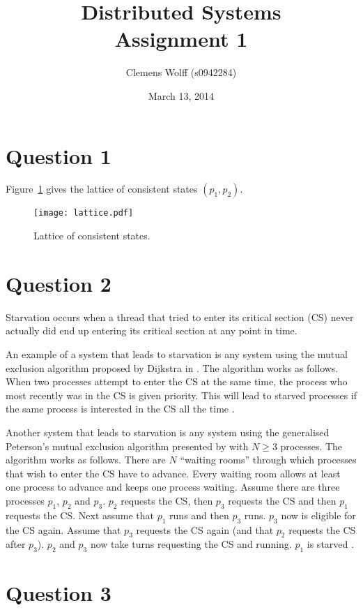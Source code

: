 \documentclass[a4paper,onecolumn,oneside]{article}
\title{Distributed Systems\\Assignment 1}
\author{Clemens Wolff (s0942284)}
\date{March 13, 2014}
\begin{document}
\maketitle

\section*{Question 1}

Figure~\ref{fig:lattice} gives the lattice of consistent states $(p_1,p_2)$.

\begin{figure}[h]
\texttt{[image: lattice.pdf]}
\caption{Lattice of consistent states.}
\label{fig:lattice}
\end{figure}

\section*{Question 2}

Starvation occurs when a thread that tried to enter its critical section (CS)
never actually did end up entering its critical section at any point in time.

An example of a system that leads to starvation is any system using the mutual
exclusion algorithm proposed by Dijkstra in \cite{dijkstra2001}.  The algorithm
works as follows.  When two processes attempt to enter the CS at the same time,
the process who most recently was in the CS is given priority.  This will lead
to starved processes if the same process is interested in the CS all the time
\cite[Theorem~5.1]{alagarsamy2003}.

Another system that leads to starvation is any system using the generalised
Peterson's mutual exclusion algorithm presented by \cite{hofri1990} with $N \geq
3$ processes.  The algorithm works as follows.  There are $N$ ``waiting rooms''
through which processes that wish to enter the CS have to advance.  Every
waiting room allows at least one process to advance and keeps one process
waiting. Assume there are three processes $p_1$, $p_2$ and $p_3$.  $p_2$
requests the CS, then $p_3$ requests the CS and then $p_1$ requests the CS\@.
Next assume that $p_1$ runs and then $p_3$ runs. $p_3$ now is eligible for the
CS again.  Assume that $p_3$ requests the CS again (and that $p_2$ requests the
CS after $p_3$).  $p_2$ and $p_3$ now take turns requesting the CS and running.
$p_1$ is starved \cite[Figure~1]{griffault2014}.

\section*{Question 3}
\end{document}
